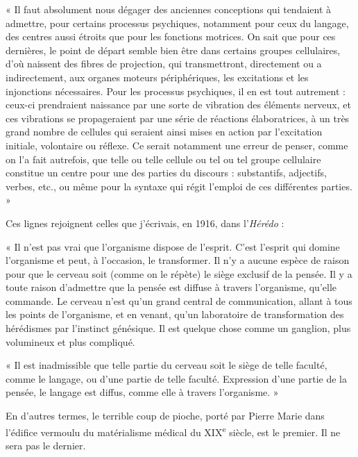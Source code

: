 \documentclass[french,twoside]{book} %
\begin{document}
« Il faut absolument nous dégager des anciennes conceptions qui tendaient à admettre, pour certains processus psychiques, notamment pour ceux du langage, des centres aussi étroits que pour les fonctions motrices. On sait que pour ces dernières, le point de départ semble bien être dans certains groupes cellulaires, d’où naissent des fibres de projection, qui transmettront, directement ou a indirectement, aux organes moteurs périphériques, les excitations et les injonctions nécessaires. Pour les processus psychiques, il en est tout autrement : ceux-ci prendraient naissance par une sorte de vibration des éléments nerveux, et ces vibrations se propageraient par une série de réactions élaboratrices, à un très grand nombre de cellules qui seraient ainsi mises en action par l’excitation initiale, volontaire ou réflexe. Ce serait notamment une erreur de penser, comme on l’a fait autrefois, que telle ou telle cellule ou tel ou tel groupe cellulaire constitue un centre pour une des parties du discours : substantifs, adjectifs, verbes, etc., ou même pour la syntaxe qui régit l’emploi de ces différentes parties. »\par
Ces lignes rejoignent celles que j’écrivais, en 1916, dans l’{\itshape Hérédo} :\par
« Il n’est pas vrai que l’organisme dispose de l’esprit. C’est l’esprit qui domine l’organisme et peut, à l’occasion, le transformer. Il n’y a aucune espèce de raison pour que le cerveau soit (comme on le répète) le siège exclusif de la pensée. Il y a toute raison d’admettre que la pensée est diffuse à travers l’organisme, qu’elle commande. Le cerveau n’est qu’un grand central de communication, allant à tous les points de l’organisme, et en venant, qu’un laboratoire de transformation des hérédismes par l’instinct génésique. Il est quelque chose comme un ganglion, plus volumineux et plus compliqué.\par
« Il est inadmissible que telle partie du cerveau soit le siège de telle faculté, comme le langage, ou d’une partie de telle faculté. Expression d’une partie de la pensée, le langage est diffus, comme elle à travers l’organisme. »\par
En d’autres termes, le terrible coup de pioche, porté par Pierre Marie dans l’édifice vermoulu du matérialisme médical du XIX\textsuperscript{e} siècle, est le premier. Il ne sera pas le dernier.\par
\end{document}
